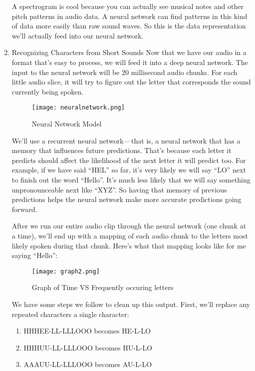 \documentclass[12pt,a4paper]{article}
\begin{document}
\begin{enumerate}
A spectrogram is cool because you can actually see musical notes and other pitch patterns in audio data. A neural network can find patterns in this kind of data more easily than raw sound waves. So this is the data representation we’ll actually feed into our neural network.

\item Recognizing Characters from Short Sounds
Now that we have our audio in a format that’s easy to process, we will feed it into a deep neural network. The input to the neural network will be 20 millisecond audio chunks. For each little audio slice, it will try to figure out the letter that corresponds the sound currently being spoken.

\begin{figure}[h]
	\centering
	\texttt{[image: neuralnetwork.png]}
	\caption{Neural Network Model}
\end{figure}

We’ll use a recurrent neural network — that is, a neural network that has a memory that influences future predictions. That’s because each letter it predicts should affect the likelihood of the next letter it will predict too. For example, if we have said “HEL” so far, it’s very likely we will say “LO” next to finish out the word “Hello”. It’s much less likely that we will say something unpronounceable next like “XYZ”. So having that memory of previous predictions helps the neural network make more accurate predictions going forward.

\newpage
			After we run our entire audio clip through the neural network (one chunk at a time), we’ll end up with a mapping of each audio chunk to the letters most likely spoken during that chunk. Here’s what that mapping looks like for me saying “Hello”:

\begin{figure}[h]
	\centering
	\texttt{[image: graph2.png]}
	\caption{Graph of Time VS Frequently occuring letters}
\end{figure}

We have some steps we follow to clean up this output. First, we’ll replace any repeated characters a single character:
\begin{enumerate}
\item HHHEE-LL-LLLOOO  becomes  HE-L-LO
\item HHHUU-LL-LLLOOO  becomes  HU-L-LO
\item AAAUU-LL-LLLOOO  becomes  AU-L-LO

\end{enumerate}


\end{enumerate}
\end{document}

